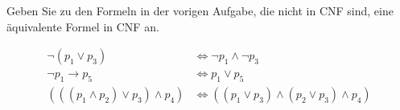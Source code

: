 
\begin{exercise}[31]

Geben Sie zu den Formeln in der vorigen Aufgabe, die nicht in CNF sind, eine äquivalente Formel in CNF an.

\end{exercise}


\begin{solution}

\begin{align*}
    \neg (p_1 \lor p_3) &\iff \neg p_1 \land \neg p_3\\
    \neg p_1 \to p_5 &\iff p_1 \lor p_5 \\
    (((p_1 \land p_2) \lor p_3) \land p_4) &\iff ((p_1 \lor p_3) \land (p_2 \lor p_3) \land p_4)
\end{align*}

\end{solution}

